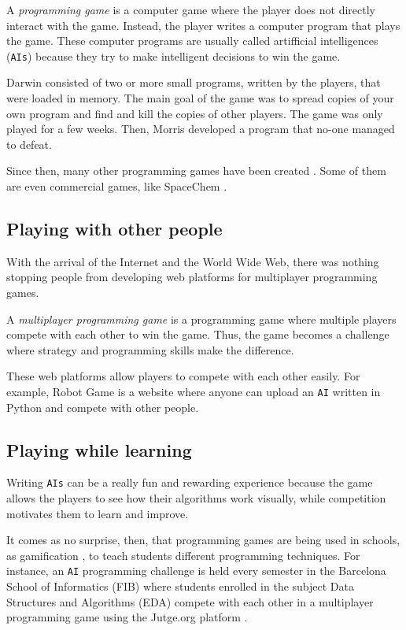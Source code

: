 \documentclass[a4paper,11pt,titlepage,abstract,numbers=noenddot,automark,mnsy,intlimits,rgb,dvipsnames]{report}
\begin{document}
A \emph{programming game} is a computer game where the player does not directly interact with the game. Instead, the
player writes a computer program that plays the game. These computer programs are usually called artifficial
intelligences (\texttt{AIs}) because they try to make intelligent decisions to win the game.

Darwin consisted of two or more small programs, written by the players, that were loaded in memory. The main goal
of the game was to spread copies of your own program and find and kill the copies of other players. The game was only
played for a few weeks. Then, Morris developed a program that no-one managed to defeat.

Since then, many other programming games have been created \cite{pg}. Some of them are even commercial games, like
SpaceChem \cite{spacechem}.
\subsection{Playing with other people}
With the arrival of the Internet and the World Wide Web, there was nothing stopping people from
developing web platforms for multiplayer programming games.

A \emph{multiplayer programming game} is a programming game where multiple players compete with each other to win the
game. Thus, the game becomes a challenge where strategy and programming skills make the difference.

These web platforms allow players to compete with each other easily. For example, Robot Game
\cite{robotgame} is a website where anyone can upload an \texttt{AI} written in \texttt{}Python\texttt{} and compete with other people.
\subsection{Playing while learning}
Writing \texttt{AIs} can be a really fun and rewarding experience because the game allows the players to see how their
algorithms work visually, while competition motivates them to learn and improve.

It comes as no surprise, then, that programming games are being used in schools, as gamification \cite{gamification},
to teach students different programming techniques.
For instance, an \texttt{AI} programming challenge is held every semester in the Barcelona School of
Informatics (FIB) where students enrolled in the subject Data Structures and Algorithms (EDA) \cite{eda}
compete with each other in a multiplayer programming game using the Jutge.org platform \cite{jutge}.
\end{document}
